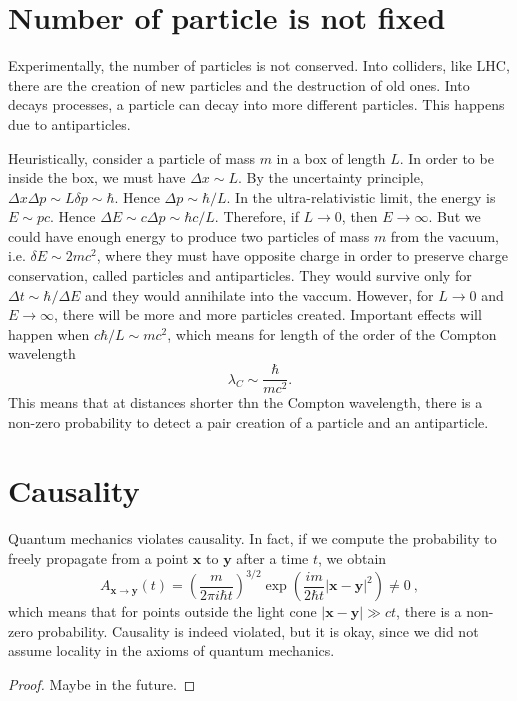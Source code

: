 \section{Number of particle is not fixed}

    Experimentally, the number of particles is not conserved. Into colliders, like LHC, there are the creation of new particles and the destruction of old ones. Into decays processes, a particle can decay into more different particles. This happens due to antiparticles. 

    Heuristically, consider a particle of mass $m$ in a box of length $L$. In order to be inside the box, we must have $\Delta x \sim L$. By the uncertainty principle, $\Delta x \Delta p \sim L \delta p \sim \hbar$. Hence $\Delta p \sim \hbar / L$. In the ultra-relativistic limit, the energy is $E \sim p c$. Hence $\Delta E \sim c \Delta p \sim \hbar c / L$. Therefore, if $L \rightarrow 0$, then $E \rightarrow \infty$. But we could have enough energy to produce two particles of mass $m$ from the vacuum, i.e. $\delta E \sim 2 m c^2$, where they must have opposite charge in order to preserve charge conservation, called particles and antiparticles. They would survive only for $\Delta t \sim \hbar / \Delta E$ and they would annihilate into the vaccum. However, for $L \rightarrow 0$ and $E \rightarrow \infty$, there will be more and more particles created. Important effects will happen when $c \hbar / L \sim m c^2$, which means for length of the order of the Compton wavelength
    \begin{equation*}
        \lambda_C \sim \frac{\hbar}{mc^2} .
    \end{equation*}
    This means that at distances shorter thn the Compton wavelength, there is a non-zero probability to detect a pair creation of a particle and an antiparticle.

\section{Causality}

    Quantum mechanics violates causality. In fact, if we compute the probability to freely propagate from a point $\mathbf x$ to $\mathbf y$ after a time $t$, we obtain 
    \begin{equation*}
        A_{\mathbf x \rightarrow \mathbf y} (t) = (\frac{m}{2 \pi i \hbar t})^{3/2} \exp(\frac{i m}{2 \hbar t} |\mathbf x - \mathbf y|^2) \neq 0 ~,
    \end{equation*}
    which means that for points outside the light cone $|\mathbf x - \mathbf y| \gg ct$, there is a non-zero probability. Causality is indeed violated, but it is okay, since we did not assume locality in the axioms of quantum mechanics.
    \begin{proof}
        Maybe in the future.
    \end{proof}

